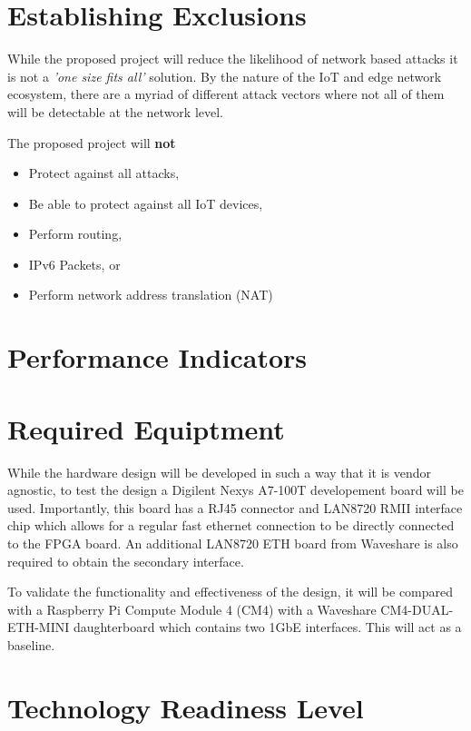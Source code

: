 \section{Establishing Exclusions}

While the proposed project will reduce the likelihood of network based attacks it is not a \textit{'one size fits all'} solution. 
By the nature of the IoT and edge network ecosystem, there are a myriad of different attack vectors where not all of them will be detectable at the
network level.

The proposed project will \textbf{not}
\begin{itemize}
    \item Protect against all attacks,
    \item Be able to protect against all IoT devices,
    \item Perform routing,
    \item IPv6 Packets, or
    \item Perform network address translation (NAT)
\end{itemize}



\section{Performance Indicators}



\section{Required Equiptment}
While the hardware design will be developed in such a way that it is vendor agnostic, to test the design a Digilent Nexys A7-100T developement board will be used.
Importantly, this board has a RJ45 connector and LAN8720 RMII interface chip which allows for a regular fast ethernet connection to be directly connected 
to the FPGA board. An additional LAN8720 ETH board from Waveshare is also required to obtain the secondary interface. 

To validate the functionality and effectiveness of the design, it will be compared with a Raspberry Pi Compute Module 4 (CM4) with a Waveshare CM4-DUAL-ETH-MINI 
daughterboard which contains two 1GbE interfaces. This will act as a baseline. 

\section{Technology Readiness Level}

